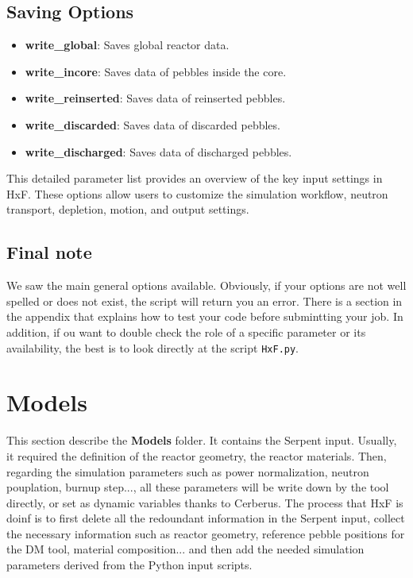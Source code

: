 \documentclass{article}
\begin{document}
\subsection{Saving Options}
\begin{itemize}
    \item \textbf{write\_global}: Saves global reactor data.
    \item \textbf{write\_incore}: Saves data of pebbles inside the core.
    \item \textbf{write\_reinserted}: Saves data of reinserted pebbles.
    \item \textbf{write\_discarded}: Saves data of discarded pebbles.
    \item \textbf{write\_discharged}: Saves data of discharged pebbles.
\end{itemize}

This detailed parameter list provides an overview of the key input settings in HxF. These options allow users to customize the simulation workflow, neutron transport, depletion, motion, and output settings.

\subsection{Final note}

We saw the main general options available. Obviously, if your options are not well spelled or does not exist, the script will return you an error. There is a section in the appendix that explains how to test your code before submintting your job. In addition, if ou want to double check the role of a specific parameter or its availability, the best is to look directly at the script \texttt{HxF.py}. 

\newpage
\section{Models}\label{sec:models}
This section describe the \textbf{Models} folder. It contains the Serpent input. Usually, it required the definition of the reactor geometry, the reactor materials. Then, regarding the simulation parameters such as power normalization, neutron pouplation, burnup step..., all these parameters will be write down by the tool directly, or set as dynamic variables thanks to Cerberus. The process that HxF is doinf is to first delete all the redoundant information in the Serpent input, collect the necessary information such as reactor geometry, reference pebble positions for the DM tool, material composition... and then add the needed simulation parameters derived from the Python input scripts. 
\end{document}

